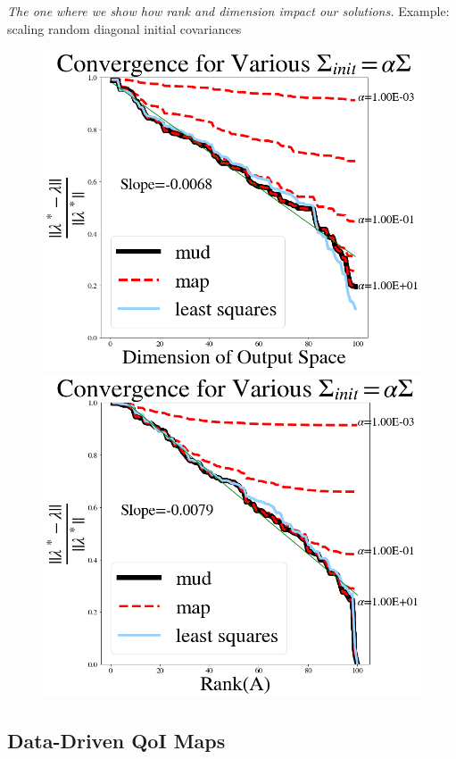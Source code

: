 \begin{frame}[t]{\it The one where we show how rank and dimension impact our solutions.}
\centering
Example: scaling random diagonal initial covariances

\begin{figure}[htbp]
  \includegraphics[width=0.475\linewidth]{figures/lin/lin-dim-cov-convergence}
  \includegraphics[width=0.475\linewidth]{figures/lin/lin-rank-cov-convergence}
\label{fig:lin-error}
\end{figure}

\end{frame}


\subsection{Data-Driven QoI Maps}

